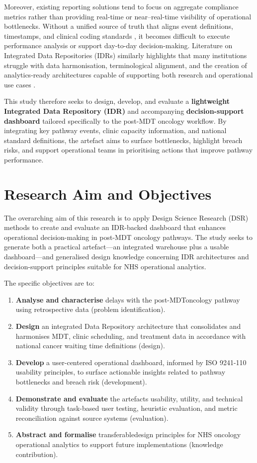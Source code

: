 Moreover, existing reporting solutions tend to focus on aggregate compliance metrics rather than providing real-time or near–real-time visibility of operational bottlenecks. Without a unified source of truth that aligns event definitions, timestamps, and clinical coding standards \citep{NHSDigital2026}, it becomes difficult to execute performance analysis or support day-to-day decision-making. Literature on Integrated Data Repositories (IDRs) similarly highlights that many institutions struggle with data harmonisation, terminological alignment, and the creation of analytics-ready architectures capable of supporting both research and operational use cases \citep{gagalova2020}.

This study therefore seeks to design, develop, and evaluate a \textbf{lightweight Integrated Data Repository (IDR)} and accompanying \textbf{decision-support dashboard} tailored specifically to the post-MDT oncology workflow. By integrating key pathway events, clinic capacity information, and national standard definitions, the artefact aims to surface bottlenecks, highlight breach risks, and support operational teams in prioritising actions that improve pathway performance.

\section{Research Aim and Objectives}

The overarching aim of this research is to apply Design Science Research (DSR) methods to create and evaluate an IDR-backed dashboard that enhances operational decision-making in post-MDT oncology pathways. The study seeks to generate both a practical artefact—an integrated warehouse plus a usable dashboard—and generalised design knowledge concerning IDR architectures and decision-support principles suitable for NHS operational analytics.

The specific objectives are to:
\begin{enumerate}
    \item \textbf{Analyse and characterise} delays with the post-MDToncology pathway using retrospective data (problem identification).
    \item \textbf{Design} an integrated Data Repository architecture that consolidates and harmonises MDT, clinic scheduling, and treatment data in accordance with national cancer waiting time definitions (design).
    \item \textbf{Develop} a user-centered operational dashboard, informed by ISO 9241-110 usability principles, to surface actionable insights related to pathway bottlenecks and breach risk (development).
    \item \textbf{Demonstrate and evaluate} the artefacts usability, utility, and technical validity through task-based user testing, heuristic evaluation, and metric reconciliation against source systems (evaluation).
    \item \textbf{Abstract and formalise} transferabledesign principles for NHS oncology operational analytics to support future implementations (knowledge contribution).
\end{enumerate}

